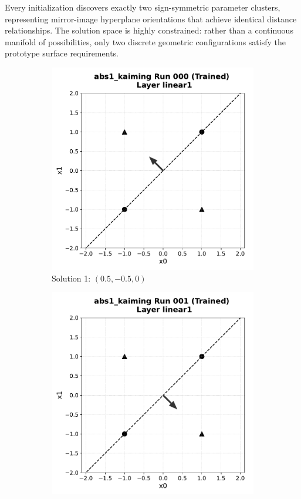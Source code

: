 Every initialization discovers exactly two sign-symmetric parameter clusters, representing mirror-image hyperplane orientations that achieve identical distance relationships. The solution space is highly constrained: rather than a continuous manifold of possibilities, only two discrete geometric configurations satisfy the prototype surface requirements.

\begin{figure}[ht]
 \centering
 \begin{subfigure}{0.46\textwidth}
   \includegraphics[width=\linewidth]{abs1/figs/kaiming_run000.pdf}
   \caption{Solution 1: $(0.5, -0.5, 0)$}
 \end{subfigure}\hfill
 \begin{subfigure}{0.46\textwidth}
   \includegraphics[width=\linewidth]{abs1/figs/kaiming_run001.pdf}

\end{subfigure}
\end{figure}
